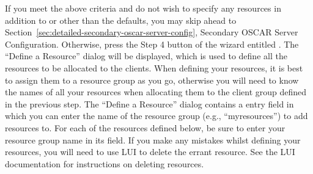 If you meet the above criteria and do not wish to specify any
resources in addition to or other than the defaults, you may skip
ahead to Section~\ref{sec:detailed-secondary-oscar-server-config},
Secondary OSCAR Server Configuration. Otherwise, press the Step 4
button of the wizard entitled .  The
``Define a Resource'' dialog will be displayed, which is used to
define all the resources to be allocated to the clients. When defining
your resources, it is best to assign them to a resource group as you
go, otherwise you will need to know the names of all your resources
when allocating them to the client group defined in the previous step.
The ``Define a Resource'' dialog contains a 
entry field in which you can enter the name of the resource group
(e.g., ``myresources'') to add resources to.  For each of the
resources defined below, be sure to enter your resource group name in
its field.   If you make any mistakes whilst defining
your resources, you will need to use LUI to delete the errant
resource. See the LUI documentation for instructions on deleting
resources.

